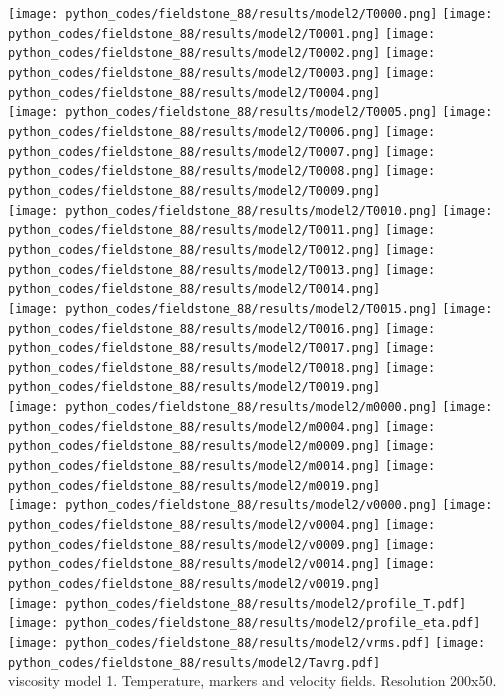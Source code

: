 \begin{center}
\texttt{[image: python\_codes/fieldstone\_88/results/model2/T0000.png]}
\texttt{[image: python\_codes/fieldstone\_88/results/model2/T0001.png]}
\texttt{[image: python\_codes/fieldstone\_88/results/model2/T0002.png]}
\texttt{[image: python\_codes/fieldstone\_88/results/model2/T0003.png]}
\texttt{[image: python\_codes/fieldstone\_88/results/model2/T0004.png]}\\
\texttt{[image: python\_codes/fieldstone\_88/results/model2/T0005.png]}
\texttt{[image: python\_codes/fieldstone\_88/results/model2/T0006.png]}
\texttt{[image: python\_codes/fieldstone\_88/results/model2/T0007.png]}
\texttt{[image: python\_codes/fieldstone\_88/results/model2/T0008.png]}
\texttt{[image: python\_codes/fieldstone\_88/results/model2/T0009.png]}\\
\texttt{[image: python\_codes/fieldstone\_88/results/model2/T0010.png]}
\texttt{[image: python\_codes/fieldstone\_88/results/model2/T0011.png]}
\texttt{[image: python\_codes/fieldstone\_88/results/model2/T0012.png]}
\texttt{[image: python\_codes/fieldstone\_88/results/model2/T0013.png]}
\texttt{[image: python\_codes/fieldstone\_88/results/model2/T0014.png]}\\
\texttt{[image: python\_codes/fieldstone\_88/results/model2/T0015.png]}
\texttt{[image: python\_codes/fieldstone\_88/results/model2/T0016.png]}
\texttt{[image: python\_codes/fieldstone\_88/results/model2/T0017.png]}
\texttt{[image: python\_codes/fieldstone\_88/results/model2/T0018.png]}
\texttt{[image: python\_codes/fieldstone\_88/results/model2/T0019.png]}\\
\texttt{[image: python\_codes/fieldstone\_88/results/model2/m0000.png]}
\texttt{[image: python\_codes/fieldstone\_88/results/model2/m0004.png]}
\texttt{[image: python\_codes/fieldstone\_88/results/model2/m0009.png]}
\texttt{[image: python\_codes/fieldstone\_88/results/model2/m0014.png]}
\texttt{[image: python\_codes/fieldstone\_88/results/model2/m0019.png]}\\
\texttt{[image: python\_codes/fieldstone\_88/results/model2/v0000.png]}
\texttt{[image: python\_codes/fieldstone\_88/results/model2/v0004.png]}
\texttt{[image: python\_codes/fieldstone\_88/results/model2/v0009.png]}
\texttt{[image: python\_codes/fieldstone\_88/results/model2/v0014.png]}
\texttt{[image: python\_codes/fieldstone\_88/results/model2/v0019.png]}\\
\texttt{[image: python\_codes/fieldstone\_88/results/model2/profile\_T.pdf]}
\texttt{[image: python\_codes/fieldstone\_88/results/model2/profile\_eta.pdf]}
\texttt{[image: python\_codes/fieldstone\_88/results/model2/vrms.pdf]}
\texttt{[image: python\_codes/fieldstone\_88/results/model2/Tavrg.pdf]}\\
{\captionfont viscosity model 1. Temperature, markers and velocity fields. Resolution 200x50.}
\end{center} 


